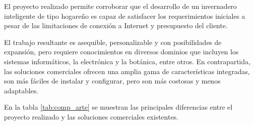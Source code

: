 El proyecto realizado permite corroborar que el desarrollo de un invernadero inteligente de tipo hogareño es capaz de satisfacer los requerimientos iniciales a pesar de las limitaciones de conexión a Internet y presupuesto del cliente.   


El trabajo resultante es asequible, personalizable y con posibilidades de expansión, pero requiere conocimientos en diversos dominios que incluyen los sistemas informáticos, la electrónica y la botánica, entre otros. En contrapartida, las soluciones comerciales ofrecen una amplia gama de características integradas, son más fáciles de instalar y configurar, pero son más costosas y menos adaptables.

En la tabla \ref{tab:comp_arte} se muestran las principales diferencias entre el proyecto realizado y las soluciones comerciales existentes.


%
%

